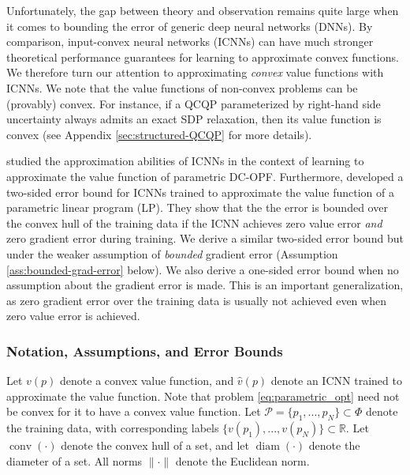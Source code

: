 \documentclass[10pt]{article} %
\theoremstyle{plain}
\theoremstyle{definition}
\theoremstyle{remark}
\begin{document}
Unfortunately, the gap between theory and observation remains quite large when it comes to bounding the error of generic deep neural networks (DNNs). By comparison, input-convex neural networks (ICNNs) \citep{pmlr-v70-amos17b} can have much stronger theoretical performance guarantees for learning to approximate convex functions. We therefore turn our attention to approximating \textit{convex} value functions with ICNNs. We note that the value functions of non-convex problems can be (provably) convex. For instance, if a QCQP parameterized by right-hand side uncertainty always admits an exact SDP relaxation, then its value function is convex (see Appendix \ref{sec:structured-QCQP} for more details).

\citet{zhang2021convex} studied the approximation abilities of ICNNs in the context of learning to approximate the value function of parametric DC-OPF.
Furthermore, \citet{rosemberg2024learning} developed a two-sided error bound for ICNNs trained to approximate the value function of a parametric linear program (LP). They show that the the error is bounded over the convex hull of the training data if the ICNN achieves zero value error \textit{and} zero gradient error during training. We derive a similar two-sided error bound but under the weaker assumption of \textit{bounded} gradient error (Assumption \ref{ass:bounded-grad-error} below). We also derive a one-sided error bound when no assumption about the gradient error is made. This is an important generalization, as zero gradient error over the training data is usually not achieved even when zero value error is achieved.

\subsubsection*{Notation, Assumptions, and Error Bounds}

Let $v(p)$ denote a convex value function, and $\hat{v}(p)$ denote an ICNN trained to approximate the value function. Note that problem \eqref{eq:parametric_opt} need not be convex for it to have a convex value function. Let $\mathcal{P} = \{p_1, ..., p_N\} \subset \Phi$ denote the training data, with corresponding labels $\{v(p_1), ..., v(p_N)\} \subset \mathbb{R}$. Let $\operatorname{conv}(\cdot)$ denote the convex hull of a set, and let $\operatorname{diam}(\cdot)$ denote the diameter of a set. All norms $\| \cdot \|$ denote the Euclidean norm.
\end{document}
